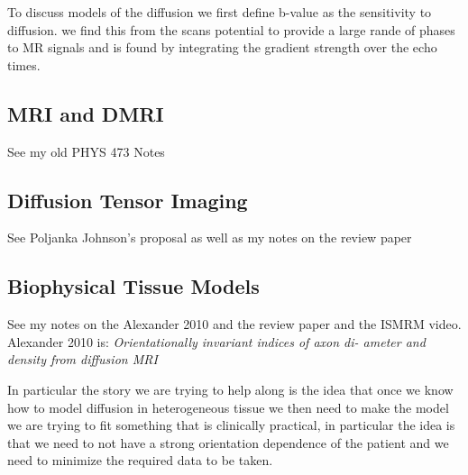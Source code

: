 To discuss models of the diffusion we first define b-value as the sensitivity to diffusion. we find this from the scans potential to provide a large rande of phases to MR signals and is found by integrating the gradient strength over the echo times.
\fi


\subsection{MRI and DMRI}
See my old PHYS 473 Notes

\subsection{Diffusion Tensor Imaging}
See Poljanka Johnson's proposal as well as my notes on the review paper

\subsection{Biophysical Tissue Models}
See my notes on the Alexander 2010 and the review paper and the ISMRM video.\\


Alexander 2010 is:
\emph{Orientationally invariant indices of axon di-
ameter and density from diffusion MRI}

In particular the story we are trying to help along is the idea that once we know how to model diffusion in heterogeneous tissue we then need to make the model we are trying to fit something that is clinically practical, in particular the idea is that we need to not have a strong orientation dependence of the patient and we need to minimize the required data to be taken.
\fi


